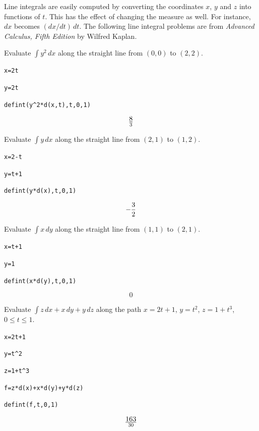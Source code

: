\newpage

\noindent
Line integrals are easily computed by
converting the coordinates $x$, $y$ and $z$ into functions of $t$.
This has the effect of changing the measure as well.
For instance, $dx$ becomes $(dx/dt)\,dt$.
The following line integral problems are from
{\it Advanced Calculus, Fifth Edition} by Wilfred Kaplan.

\medskip
\noindent
Evaluate $\int y^2\,dx$ along the straight
line from $(0,0)$ to $(2,2)$.

\medskip
\verb$x=2t$

\verb$y=2t$

\verb$defint(y^2*d(x,t),t,0,1)$

$$8\over3$$

\medskip
\noindent
Evaluate $\int y\,dx$ along the straight line from
$(2,1)$ to $(1,2)$.

\medskip
\verb$x=2-t$

\verb$y=t+1$

\verb$defint(y*d(x),t,0,1)$

$$-{3\over2}$$

\medskip
\noindent
Evaluate $\int x\,dy$ along the straight line from
$(1,1)$ to $(2,1)$.

\medskip
\verb$x=t+1$

\verb$y=1$

\verb$defint(x*d(y),t,0,1)$

$$0$$

\medskip
\noindent
Evaluate $\int z\,dx+x\,dy+y\,dz$
along the path
$x=2t+1$, $y=t^2$, $z=1+t^3$, $0\le t\le 1$.

\medskip
\verb$x=2t+1$

\verb$y=t^2$

\verb$z=1+t^3$

\verb$f=z*d(x)+x*d(y)+y*d(z)$

\verb$defint(f,t,0,1)$

$$163\over30$$

